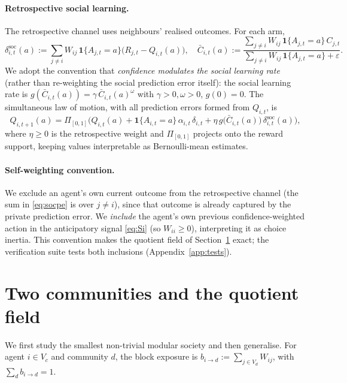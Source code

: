 \documentclass[11pt]{article}
\newcommand{\1}{\mathbf{1}}
\begin{document}
\paragraph{Retrospective social learning.}
The retrospective channel uses neighbours' realised outcomes. For each arm,
\begin{equation}
\delta^{\mathrm{soc}}_{i,t}(a):=\sum_{j\neq i}W_{ij}\,\1\{A_{j,t}=a\}\bigl(R_{j,t}-Q_{i,t}(a)\bigr),
\quad
\bar C_{i,t}(a):=\frac{\sum_{j\neq i}W_{ij}\,\1\{A_{j,t}=a\}\,C_{j,t}}
{\sum_{j\neq i}W_{ij}\,\1\{A_{j,t}=a\}+\varepsilon}.
\label{eq:socpe}
\end{equation}
We adopt the convention that \emph{confidence modulates the social learning
rate} (rather than re-weighting the social prediction error itself): the social
learning rate is $g(\bar C_{i,t}(a))=\gamma\,\bar C_{i,t}(a)^{\omega}$ with
$\gamma>0,\omega>0$, $g(0)=0$. The simultaneous law of motion, with all
prediction errors formed from $Q_{i,t}$, is
\begin{equation}
Q_{i,t+1}(a)=\Pi_{[0,1]}\!\Big(
Q_{i,t}(a)+\1\{A_{i,t}=a\}\,\alpha_{i,t}\,\delta_{i,t}
+\eta\,g\!\big(\bar C_{i,t}(a)\big)\,\delta^{\mathrm{soc}}_{i,t}(a)\Big),
\label{eq:update}
\end{equation}
where $\eta\ge0$ is the retrospective weight and $\Pi_{[0,1]}$ projects onto the
reward support, keeping values interpretable as Bernoulli-mean estimates.

\paragraph{Self-weighting convention.}
We exclude an agent's own current outcome from the retrospective channel
(the sum in \eqref{eq:socpe} is over $j\neq i$), since that outcome is already
captured by the private prediction error. We \emph{include} the agent's own
previous confidence-weighted action in the anticipatory signal \eqref{eq:Si}
(so $W_{ii}\ge0$), interpreting it as choice inertia. This convention makes the
quotient field of Section~\ref{sec:quotient} exact; the verification suite tests
both inclusions (Appendix~\ref{app:tests}).

\section{Two communities and the quotient field}
\label{sec:quotient}

We first study the smallest non-trivial modular society and then generalise. For
agent $i\in V_c$ and community $d$, the block exposure is
$b_{i\to d}:=\sum_{j\in V_d}W_{ij}$, with $\sum_d b_{i\to d}=1$.
\end{document}
